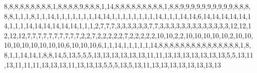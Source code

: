8,8,8,8,8,8,8,8,8,1,8,8,8,8,9,8,8,8,1,14,8,8,8,8,8,8,8,8,8,1,8,8,9,9,9,9,9,9,9,9,9,9,8,8,8,8,8,1,1,1,8,1,1,14,1,1,1,1,1,1,1,14,14,1,1,1,1,1,1,1,1,14,1,1,1,14,14,6,14,14,14,14,14,14,1,1,1,14,14,14,14,14,14,1,1,1,2,7,7,7,3,3,3,3,3,3,7,7,3,3,3,3,3,3,3,3,3,3,3,3,3,12,12,12,12,12,7,7,7,7,7,7,7,7,7,7,2,2,7,2,2,2,2,2,7,2,2,2,2,2,10,10,2,2,10,10,10,10,10,2,10,10,10,10,10,10,10,10,10,6,10,10,10,6,1,1,14,1,1,1,1,1,14,8,8,8,8,8,8,8,8,8,8,8,8,8,8,8,1,8,8,1,1,14,14,1,8,8,14,5,13,5,5,5,13,13,13,13,13,13,11,11,13,13,13,13,13,13,13,5,5,13,11,13,11,11,11,13,13,13,11,13,13,13,5,5,5,13,5,13,11,13,13,13,13,13,13,13,13

